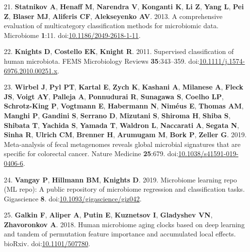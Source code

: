 \documentclass[11pt,]{article}
\begin{document}
\hypertarget{ref-statnikov_comprehensive_2013}{}
21. \textbf{Statnikov A}, \textbf{Henaff M}, \textbf{Narendra V},
\textbf{Konganti K}, \textbf{Li Z}, \textbf{Yang L}, \textbf{Pei Z},
\textbf{Blaser MJ}, \textbf{Aliferis CF}, \textbf{Alekseyenko AV}. 2013.
A comprehensive evaluation of multicategory classification methods for
microbiomic data. Microbiome \textbf{1}:11.
doi:\href{https://doi.org/10.1186/2049-2618-1-11}{10.1186/2049-2618-1-11}.

\hypertarget{ref-knights_supervised_2011}{}
22. \textbf{Knights D}, \textbf{Costello EK}, \textbf{Knight R}. 2011.
Supervised classification of human microbiota. FEMS Microbiology Reviews
\textbf{35}:343--359.
doi:\href{https://doi.org/10.1111/j.1574-6976.2010.00251.x}{10.1111/j.1574-6976.2010.00251.x}.

\hypertarget{ref-wirbel_meta-analysis_2019}{}
23. \textbf{Wirbel J}, \textbf{Pyl PT}, \textbf{Kartal E}, \textbf{Zych
K}, \textbf{Kashani A}, \textbf{Milanese A}, \textbf{Fleck JS},
\textbf{Voigt AY}, \textbf{Palleja A}, \textbf{Ponnudurai R},
\textbf{Sunagawa S}, \textbf{Coelho LP}, \textbf{Schrotz-King P},
\textbf{Vogtmann E}, \textbf{Habermann N}, \textbf{Niméus E},
\textbf{Thomas AM}, \textbf{Manghi P}, \textbf{Gandini S},
\textbf{Serrano D}, \textbf{Mizutani S}, \textbf{Shiroma H},
\textbf{Shiba S}, \textbf{Shibata T}, \textbf{Yachida S}, \textbf{Yamada
T}, \textbf{Waldron L}, \textbf{Naccarati A}, \textbf{Segata N},
\textbf{Sinha R}, \textbf{Ulrich CM}, \textbf{Brenner H},
\textbf{Arumugam M}, \textbf{Bork P}, \textbf{Zeller G}. 2019.
Meta-analysis of fecal metagenomes reveals global microbial signatures
that are specific for colorectal cancer. Nature Medicine
\textbf{25}:679.
doi:\href{https://doi.org/10.1038/s41591-019-0406-6}{10.1038/s41591-019-0406-6}.

\hypertarget{ref-vangay_microbiome_2019}{}
24. \textbf{Vangay P}, \textbf{Hillmann BM}, \textbf{Knights D}. 2019.
Microbiome learning repo (ML repo): A public repository of microbiome
regression and classification tasks. Gigascience \textbf{8}.
doi:\href{https://doi.org/10.1093/gigascience/giz042}{10.1093/gigascience/giz042}.

\hypertarget{ref-galkin_human_2018}{}
25. \textbf{Galkin F}, \textbf{Aliper A}, \textbf{Putin E},
\textbf{Kuznetsov I}, \textbf{Gladyshev VN}, \textbf{Zhavoronkov A}.
2018. Human microbiome aging clocks based on deep learning and tandem of
permutation feature importance and accumulated local effects. bioRxiv.
doi:\href{https://doi.org/10.1101/507780}{10.1101/507780}.
\end{document}
